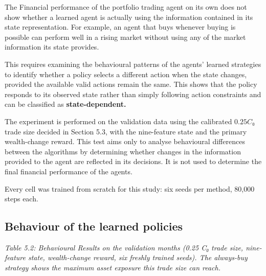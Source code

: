 The Financial performance of the portfolio trading agent on its own does
not show whether a learned agent is actually using the information
contained in its state representation. For example, an agent that buys
whenever buying is possible can perform well in a rising market without
using any of the market information its state provides.

This requires examining the behavioural patterns of the agents' learned
strategies to identify whether a policy selects a different action when
the state changes, provided the available valid actions remain the same.
This shows that the policy responds to its observed state rather than
simply following action constraints and can be classified as
\textbf{state-dependent.}

The experiment is performed on the validation data using the calibrated
\(0.25C₀\) trade size decided in Section 5.3, with the nine-feature
state and the primary wealth-change reward. This test aims only to
analyse behavioural differences between the algorithms by determining
whether changes in the information provided to the agent are reflected
in its decisions. It is not used to determine the final financial
performance of the agents.

Every cell was trained from scratch for this study: six seeds per
method, 80,000 steps each.

\subsection{Behaviour of the learned policies}

\emph{Table 5.2: Behavioural Results on the validation months (0.25 C₀
trade size, nine-feature state, wealth-change reward, six freshly
trained seeds). The always-buy strategy shows the maximum asset exposure
this trade size can reach.}

